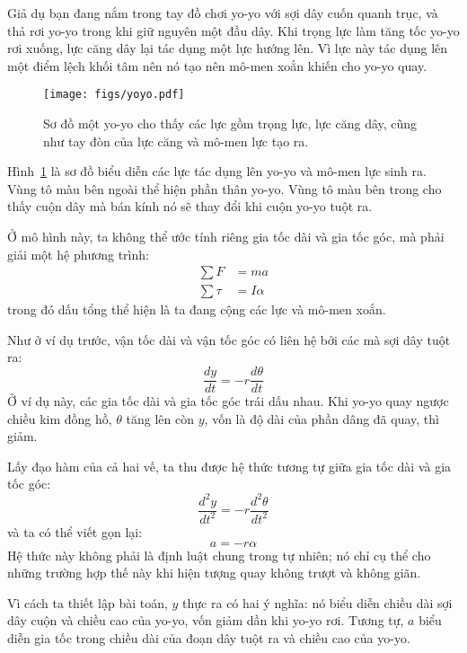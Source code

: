 \documentclass[12pt, openany]{book}
\theoremstyle{exercise}
\begin{document}
Giả dụ bạn đang nắm trong tay đồ chơi yo-yo với sợi dây cuốn quanh trục, và thả rơi yo-yo trong khi giữ nguyên một đầu dây. Khi trọng lực làm tăng tốc yo-yo rơi xuống, lực căng dây lại tác dụng một lực hướng lên. Vì lực này tác dụng lên một điểm lệch khối tâm nên nó tạo nên mô-men xoắn khiến cho yo-yo quay.


\begin{figure}
\centerline{\texttt{[image: figs/yoyo.pdf]}}
\caption{Sơ đồ một yo-yo cho thấy các lực gồm trọng lực, lực căng dây, cũng như tay đòn của lực căng và mô-men lực tạo ra.}
\label{yoyo}
\end{figure}

Hình~\ref{yoyo} là sơ đồ biểu diễn các lực tác dụng lên yo-yo và mô-men lực sinh ra. Vùng tô màu bên ngoài thể hiện phần thân yo-yo.  Vùng tô màu bên trong cho thấy cuộn dây mà bán kính nó sẽ thay đổi khi cuộn yo-yo tuột ra.


Ở mô hình này, ta không thể ước tính riêng gia tốc dài và gia tốc góc, mà phải giải một hệ phương trình:
%
\begin{align*}
\sum F &= m a \\
\sum \tau &= I \alpha
\end{align*}
%
trong đó dấu tổng thể hiện là ta đang cộng các lực và mô-men xoắn.

Như ở ví dụ trước, vận tốc dài và vận tốc góc có liên hệ bởi các mà sợi dây tuột ra:
%
\[ \frac{dy}{dt} = -r \frac{d \theta}{dt} \]
%
Ở ví dụ này, các gia tốc dài và gia tốc góc trái dấu nhau. Khi yo-yo quay ngược chiều kim đồng hồ, $\theta$ tăng lên còn $y$, vốn là độ dài của phần dâng đã quay, thì giảm.

Lấy đạo hàm của cả hai vế, ta thu được hệ thức tương tự giữa gia tốc dài và gia tốc góc:
%
\[ \frac{d^2 y}{dt^2} = -r \frac{d^2 \theta}{dt^2} \]
%
và ta có thể viết gọn lại:
%
\[ a = -r \alpha \]
%
Hệ thức này không phải là định luật chung trong tự nhiên; nó chỉ cụ thể cho những trường hợp thế này khi hiện tượng quay không trượt và không giãn.


Vì cách ta thiết lập bài toán, $y$ thực ra có hai ý nghĩa: nó biểu diễn chiều dài sợi dây cuộn và chiều cao của yo-yo, vốn giảm dần khi yo-yo rơi. Tương tự, $a$ biểu diễn gia tốc trong chiều dài của đoạn dây tuột ra và chiều cao của yo-yo.
\end{document}
